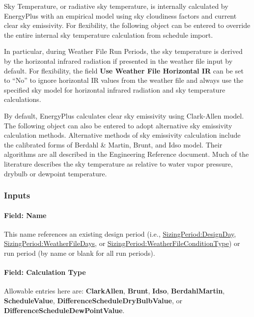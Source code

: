 Sky Temperature, or radiative sky temperature, is internally calculated by EnergyPlus with an empirical model using sky cloudiness factors and current clear sky emissivity. For flexibility, the following object can be entered to override the entire internal sky temperature calculation from schedule import.

In particular, during Weather File Run Periods, the sky temperature is derived by the horizontal infrared radiation if presented in the weather file input by default. For flexibility, the field \textbf{Use Weather File Horizontal IR} can be set to ``No'' to ignore horizontal IR values from the weather file and always use the specified sky model for horizontal infrared radiation and sky temperature calculations.

By default, EnergyPlus calculates clear sky emissivity using Clark-Allen model. The following object can also be entered to adopt alternative sky emissivity calculation methods. Alternative methods of sky emissivity calculation include the calibrated forms of Berdahl \& Martin, Brunt, and Idso model. Their algorithms are all described in the Engineering Reference document. Much of the literature describes the sky temperature as relative to water vapor pressure, drybulb or dewpoint temperature.

\subsubsection{Inputs}\label{inputs-8-011}

\paragraph{Field: Name}\label{field-name-7-009}

This name references an existing design period (i.e., \hyperref[sizingperioddesignday]{SizingPeriod:DesignDay}, \hyperref[sizingperiodweatherfiledays]{SizingPeriod:WeatherFileDays}, or \hyperref[sizingperiodweatherfileconditiontype]{SizingPeriod:WeatherFileConditionType}) or run period (by name or blank for all run periods).

\paragraph{Field: Calculation Type}\label{field-calculation-type}

Allowable entries here are: \textbf{ClarkAllen}, \textbf{Brunt}, \textbf{Idso}, \textbf{BerdahlMartin}, \textbf{ScheduleValue}, \textbf{DifferenceScheduleDryBulbValue}, or \textbf{DifferenceScheduleDewPointValue}.

